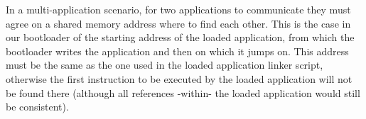 \documentclass[11pt]{article} %
\begin{document}
In a multi-application scenario, for two applications to communicate they must agree on a shared memory address where to find each other. This is the case in our bootloader of the starting address of the loaded application, from which the bootloader writes the application and then on which it jumps on. This address must be the same as the one used in the loaded application linker script, otherwise the first instruction to be executed by the loaded application will not be found there (although all references -within- the loaded application would still be consistent).

\end{document}
